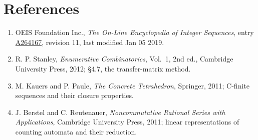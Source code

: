 \documentclass[11pt]{article}
\theoremstyle{definition}
\begin{document}
\section{References}

\begin{enumerate}

\item OEIS Foundation Inc., \emph{The On-Line Encyclopedia of Integer Sequences}, entry \href{https://oeis.org/A264167}{A264167}, revision 11, last modified Jan 05 2019.

\item R. P. Stanley, \emph{Enumerative Combinatorics}, Vol.~1, 2nd ed., Cambridge University Press, 2012; \S4.7, the transfer-matrix method.

\item M. Kauers and P. Paule, \emph{The Concrete Tetrahedron}, Springer, 2011; C-finite sequences and their closure properties.

\item J. Berstel and C. Reutenauer, \emph{Noncommutative Rational Series with Applications}, Cambridge University Press, 2011; linear representations of counting automata and their reduction.

\end{enumerate}
\end{document}
